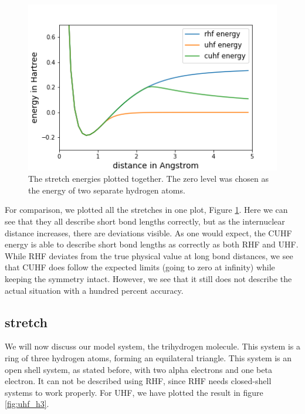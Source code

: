 \documentclass[twoside,twocolumn,9pt]{article}
\begin{document}
\begin{center}
  \begin{figure}[h]
    \includegraphics[width=\linewidth]{./../notes/figures/combo.png}
    \caption{The stretch energies plotted together. The zero level was chosen as the energy of two separate hydrogen atoms.}
    \label{fig:combo}
  \end{figure}
\end{center}

For comparison, we plotted all the stretches in one plot, Figure \ref{fig:combo}. Here we can see that they all describe short bond lengths correctly, but as the internuclear distance
increases, there are deviations visible. As one would expect, the CUHF energy is able to describe short bond lengths as correctly as both RHF and UHF. While RHF deviates from the
true physical value at long bond distances, we see that CUHF does follow the expected limits (going to zero at infinity) while keeping the symmetry intact. However, we see that it still
does not describe the actual situation with a hundred percent accuracy.

\subsection{ stretch}
\label{subsec:h3}
We will now discuss our model system, the trihydrogen molecule. This system is a ring of three hydrogen atoms, forming an equilateral triangle.
This system is an open shell system, as stated before, with two alpha electrons and one beta electron. It can not be described using RHF, since RHF needs closed-shell systems to work 
properly. For UHF, we have plotted the result in figure \ref{fig:uhf_h3}.
\end{document}
